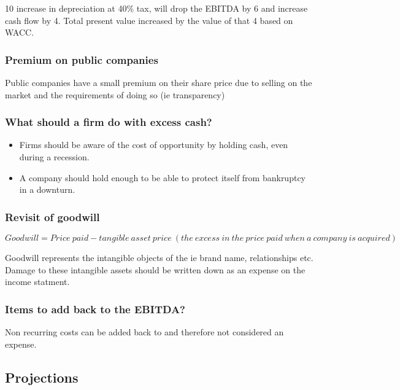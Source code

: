 \documentclass[11pt]{scrartcl} %
\begin{document}
10 increase in depreciation at 40\% tax, will drop the EBITDA by 6 and increase cash flow by 4. 
Total present value increased by the value of that 4 based on WACC.

\subsubsection{Premium on public companies}

Public companies have a small premium on their share price due to selling on the market and the requirements of doing so (ie transparency)

\subsubsection{What should a firm do with excess cash?}

\begin{itemize}
	\item Firms should be aware of the cost of opportunity by holding cash, even during a recession.
	\item A company should hold enough to be able to protect itself from bankruptcy in a downturn.
\end{itemize}

\subsubsection{Revisit of goodwill}

\[ Goodwill = Price\:paid - tangible\:asset\:price\:(the\:excess\:in\:the\:price\:paid\:when\:a\:company\:is\:acquired) \]

Goodwill represents the intangible objects of the ie brand name, relationships etc.\\

Damage to these intangible assets should be written down as an expense on the income statment.

\subsubsection{Items to add back to the EBITDA?}

Non recurring costs can be added back to and therefore not considered an expense.

\subsection{Projections}
\end{document}
